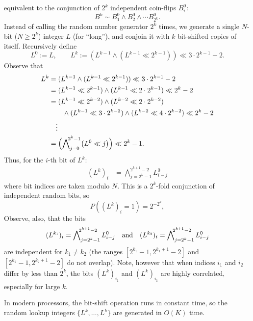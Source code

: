 equivalent to the conjunction of $2^k$ independent coin-flips $B_i^0$:
$$B^k \sim B^0_1 \wedge B^0_2 \wedge \cdots B^0_{2^k}.$$
Instead of calling the random number generator $2^k$ times,
we generate a single $N$-bit ($N\geq2^k$) integer $L$ (for ``long''), and 
conjoin it with $k$ bit-shifted copies of itself.  Recursively define
\begin{equation}
L^0 := L, \qquad L^k := (L^{k-1} \wedge (L^{k-1} \ll 2^{k-1})) \ll 3\cdot 2^{k-1}-2.
\end{equation}
Observe that
\begin{align*}
L^k &= (L^{k-1} \wedge (L^{k-1} \ll 2^{k-1})) \ll 3\cdot 2^{k-1}-2 \\
&= (L^{k-1} \ll 2^{k-1}) \wedge (L^{k-1} \ll 2\cdot 2^{k-1}) \ll 2^k-2 \\
&= (L^{k-1} \ll 2^{k-2}) \wedge (L^{k-2} \ll 2\cdot 2^{k-2})\\
&\qquad\wedge (L^{k-1} \ll 3\cdot2^{k-2}) \wedge (L^{k-2} \ll 4\cdot 2^{k-2})  \ll 2^k-2\\ 
&\quad\vdots\\
&= \Bigl(\bigwedge\nolimits_{j=0}^{\!\!2^k-1} \bigl(L^0 \ll j\bigr)\Bigr) \ll 2^k-1.
\end{align*}
Thus, for the $i$-th bit of $L^k$:
\def\ww{\,\wedge\,}
\begin{align*}
(L^k)_i %
&= \bigwedge\nolimits_{j=2^k-1}^{\!\!2^{k+1}-2} L^0_{i-j}
\end{align*}
where bit indices are taken modulo $N$.  
This is a $2^k$-fold conjunction of independent random bits, so 
$$P((L^k)_i=1) = 2^{-2^k},$$
Observe, also, that the bits 
$$(L^{k_1})_i = \bigwedge\nolimits_{j=2^k-1}^{\!\!2^{k+1}-2} L^0_{i-j} \quad\text{and}\quad
(L^{k_2})_i = \bigwedge\nolimits_{j=2^k-1}^{\!\!2^{k+1}-2} L^0_{i-j}$$
are independent for $k_1\neq k_2$ (the ranges $[2^{k_1}-1, 2^{k_1+1}-2]$
and $[2^{k_2}-1, 2^{k_2+1}-2]$ do not overlap).
Note, however that when indices $i_1$ and $i_2$ differ by less than $2^k$,
the bits $(L^k)_{i_1}$ and $(L^k)_{i_1}$ are highly correlated, especially for large $k$.

In modern processors, the bit-shift operation runs in constant time, so
the random lookup integers $\{L^k, \ldots, L^k\}$ are generated in $O(K)$ time.

